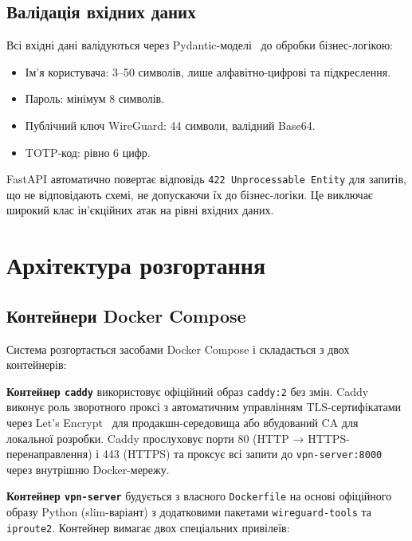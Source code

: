 \subsection{Валідація вхідних даних}

Всі вхідні дані валідуються через Pydantic-моделі~\cite{pydantic_docs}
до обробки бізнес-логікою:

\begin{itemize}
  \item Ім'я користувача: 3--50 символів, лише алфавітно-цифрові
    та підкреслення.
  \item Пароль: мінімум 8 символів.
  \item Публічний ключ WireGuard: 44 символи, валідний Base64.
  \item TOTP-код: рівно 6 цифр.
\end{itemize}

FastAPI автоматично повертає відповідь \texttt{422 Unprocessable Entity}
для запитів, що не відповідають схемі, не допускаючи їх до
бізнес-логіки. Це виключає широкий клас ін'єкційних атак на рівні
вхідних даних.

\section{Архітектура розгортання}
\label{sec:deployment_design}

\subsection{Контейнери Docker Compose}

Система розгортається засобами Docker Compose і складається
з двох контейнерів:

\textbf{Контейнер \texttt{caddy}} використовує офіційний образ
\texttt{caddy:2} без змін. Caddy виконує роль зворотного проксі з
автоматичним управлінням TLS-сертифікатами через Let's Encrypt~\cite{letsencrypt2015}
для продакшн-середовища або вбудований CA для локальної розробки.
Caddy прослуховує порти 80 (HTTP → HTTPS-перенаправлення) і 443 (HTTPS)
та проксує всі запити до \texttt{vpn-server:8000} через внутрішню
Docker-мережу.

\textbf{Контейнер \texttt{vpn-server}} будується з власного
\texttt{Dockerfile} на основі офіційного образу Python (slim-варіант) з додатковими
пакетами \texttt{wireguard-tools} та \texttt{iproute2}. Контейнер
вимагає двох спеціальних привілеїв:

